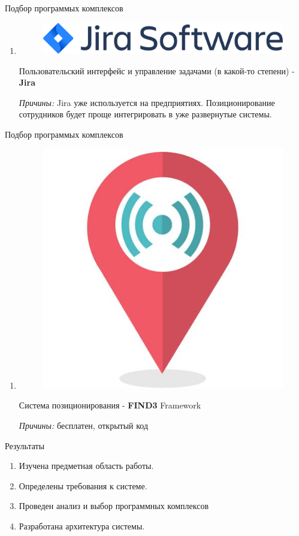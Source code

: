 \begin{frame}{Подбор программых комплексов}
	\begin{enumerate}
		[]\item 
		\begin{figure}
			\includegraphics[width=0.4\linewidth]{images/jira_software.png}
		\end{figure}
		Пользовательский интерфейс и управление задачами 
		(в какой-то степени) - \textbf{Jira}
		
		\textit{Причины:} Jira уже используется на предприятиях.
		Позиционирование сотрудников будет проще интегрировать в уже
		развернутые системы. 
		
	\end{enumerate}
\end{frame}

\begin{frame}{Подбор программых комплексов}
	\begin{enumerate}
		[]\item 
		\begin{figure}
			\includegraphics[width=0.15\linewidth]{images/find3.png}
		\end{figure}
		Система позиционирования - \textbf{FIND3} Framework 
		
		\textit{Причины:} бесплатен, открытый код
	\end{enumerate}
\end{frame}

\begin{frame}{Результаты}
	\begin{enumerate}
		\item Изучена предметная область работы.
		\item Определены требования к системе.
		\item Проведен анализ и выбор программных комплексов 
		\item Разработана архитектура системы.
	\end{enumerate}
\end{frame}

	